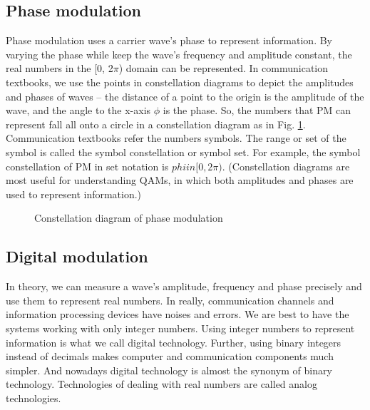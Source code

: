 \documentclass{book}
\begin{document}
\subsection{Phase modulation}
Phase modulation uses a carrier wave's phase to represent information. By varying the phase while keep the wave's frequency and amplitude constant, the real numbers in the [0, 2$\pi$) domain can be represented. In communication textbooks, we use the points in constellation diagrams to depict the amplitudes and phases of waves -- 
the distance of a point to the origin is the amplitude of the wave, and the angle to the x-axis $\phi$ is the phase. 
So, the numbers that PM can represent fall all onto a circle in a constellation diagram as in Fig. \ref{PM}. Communication textbooks refer the numbers symbols. The range or set of the symbol is called the symbol constellation or symbol set. For example, the symbol constellation of PM in set notation is $phi in [0, 2\pi)$.
(Constellation diagrams are most useful for understanding QAMs, in which both amplitudes and phases are used to represent information.)

\begin{figure}[ht]
\caption{Constellation diagram of phase modulation}
\label{PM}
\end{figure}

\subsection{Digital modulation}
In theory, we can measure a wave's amplitude, frequency and phase precisely and use them to represent real numbers. In really, communication channels and information processing devices have noises and errors. We are best to have the systems working with only integer numbers. Using integer numbers to represent information is what we call digital technology. Further, using binary integers instead of decimals makes computer and communication components much simpler. And nowadays digital technology is almost the synonym of binary technology. Technologies of dealing with real numbers are called analog technologies.
\end{document}
